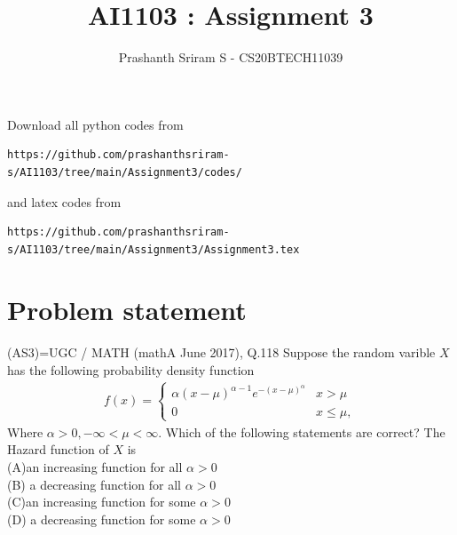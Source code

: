 \documentclass[journal,12pt,twocolumn]{IEEEtran}
\begin{document}
     \def\rightbox#1{\makebox[0in][r]{#1}}
     \def\centbox#1{\makebox[0in]{#1}}
     \def\topbox#1{\raisebox{-\baselineskip}[0in][0in]{#1}}
     \def\midbox#1{\raisebox{-0.5\baselineskip}[0in][0in]{#1}}
\vspace{3cm}
\title{AI1103 : Assignment 3}
\author{Prashanth Sriram S - CS20BTECH11039}
\maketitle
\newpage
\bigskip
\renewcommand{\thefigure}{\theenumi}
\renewcommand{\thetable}{\theenumi}
Download all python codes from 
\begin{lstlisting}
https://github.com/prashanthsriram-s/AI1103/tree/main/Assignment3/codes/
\end{lstlisting}
%
and latex codes from 
%
\begin{lstlisting}
https://github.com/prashanthsriram-s/AI1103/tree/main/Assignment3/Assignment3.tex
\end{lstlisting}
\section*{\textbf{Problem statement}}
(AS3)=UGC / MATH (mathA June 2017), Q.118
Suppose the random varible $X$ has the following probability density function
\begin{align}
f(x)=
\begin{cases}
\alpha(x-\mu)^{\alpha-1}e^{-(x-\mu)^\alpha} &x>\mu\\
0 &x\leq\mu,
\end{cases}
\end{align}
Where $\alpha>0, -\infty<\mu<\infty$. Which of the following statements are correct? The Hazard function of $X$ is\\
(A)an increasing function for all $\alpha>0$\\
(B) a decreasing function for all $\alpha>0$\\
(C)an increasing function for some $\alpha>0$\\
(D) a decreasing function for some $\alpha>0$
\end{document}
